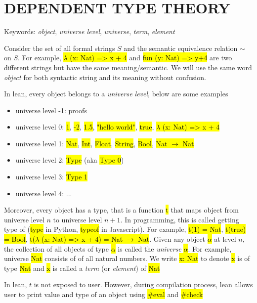 \chapter{DEPENDENT TYPE THEORY}

Keywords: \textit{object}, \textit{universe level}, \textit{universe}, \textit{term}, \textit{element}

Consider the set of all formal strings $S$ and the semantic equivalence relation $\sim$ on $S$. For example, \hl{$\lambda$ (x: Nat) => x + 4} and \hl{fun (y: Nat) => y+4} are two different strings but have the same meaning/semantic. We will use the same word \textit{object} for both syntactic string and its meaning without confusion.

In lean, every object belongs to a \textit{universe level}, below are some examples

\begin{itemize}
	\item universe level -1: proofs
	\item universe level 0: \hl{1}, \hl{-2}, \hl{1.5}, \hl{"hello world"}, \hl{true}, \hl{$\lambda$ (x: Nat) => x + 4}
	\item universe level 1: \hl{Nat}, \hl{Int}, \hl{Float}, \hl{String}, \hl{Bool}, \hl{Nat $\to$ Nat}
	\item universe level 2: \hl{Type} (aka \hl{Type 0})
	\item universe level 3: \hl{Type 1}
	\item universe level 4: ...
\end{itemize}

Moreover, every object has a type, that is a function \hl{t} that maps object from universe level $n$ to universe level $n+1$. In programming, this is called getting type of (\hl{type} in Python, \hl{typeof} in Javascript). For example, \hl{t(1) = Nat}, \hl{t(true) = Bool}, \hl{t($\lambda$ (x: Nat) => x + 4) = Nat $\to$ Nat}. Given any object \hl{$\alpha$} at level $n$, the collection of all objects of type \hl{$\alpha$} is called the \textit{universe} \hl{$\alpha$}. For example, universe \hl{Nat} consists of of all natural numbers. We write \hl{x: Nat} to denote \hl{x} is of type \hl{Nat} and \hl{x} is called a \textit{term} (or \textit{element}) of \hl{Nat}

In lean, $t$ is not exposed to user. However, during compilation process, lean allows user to print value and type of an object using \hl{\#eval} and \hl{\#check}





